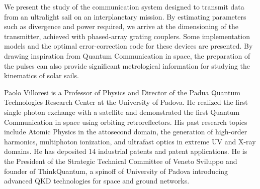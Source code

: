 \documentclass[a4paper,parskip,10pt]{scrartcl}
\begin{document}
    \begin{tcolorbox}[
        enhanced,
        title={Keynote Lecture 6: Paolo Villoresi (University of Padova) \\  Harnessing the light emission for extreme space optical communication},
        sharp corners,
        colbacktitle=thistrack,
        fonttitle=\large\mediumfont,
        boxsep=0pt,
        boxrule=0pt,
        left*=0pt,
        lefttitle=4mm,
        toptitle=4mm,
        bottomtitle=4mm,
        top=0pt,
        bottom=0pt,
        sidebyside,
        sidebyside align=center,
        lefthand width=6cm,
        segmentation empty,
    ]%
        
        \tcblower

        \setlength{\parskip}{1ex}
        
        \vspace{1ex}
        We present the study of the communication system designed to transmit data from an ultralight sail on an interplanetary mission. By estimating parameters such as divergence and power required, we arrive at the dimensioning of the transmitter, achieved with phased-array grating couplers. Some implementation models and the optimal error-correction code for these devices are presented. By drawing inspiration from Quantum Communication in space, the preparation of the pulses can also provide significant metrological information for studying the kinematics of solar sails.

        {
            \small
            \color{white!20!black}
            Paolo Villoresi is a Professor of Physics and Director of the Padua Quantum Technologies Research Center at the University of Padova. He realized the first single photon exchange with a satellite and demonstrated the first Quantum Communication in space using orbiting retroreflectors. His past research topics include Atomic Physics in the attosecond domain, the generation of high-order harmonics, multiphoton ionization, and ultrafast optics in extreme UV and X-ray domains. He has deposited 14 industrial patents and patent applications. He is the President of the Strategic Technical Committee of Veneto Sviluppo and founder of ThinkQuantum, a spinoff of University of Padova introducing advanced QKD technologies for space and ground networks.}


\end{tcolorbox}
\end{document}
